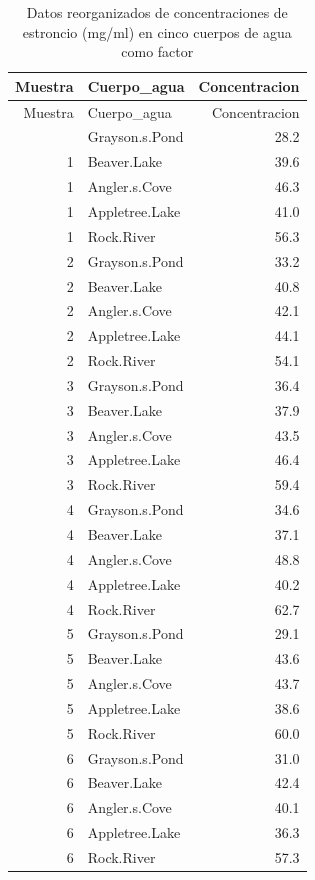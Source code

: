 \documentclass[
]{article}
\begin{document}
\begin{longtable}[]{@{}rlr@{}}
\caption{Datos reorganizados de concentraciones de estroncio (mg/ml) en
cinco cuerpos de agua como factor}\tabularnewline
\toprule\noalign{}
Muestra & Cuerpo\_agua & Concentracion \\
\midrule\noalign{}
\endfirsthead
\toprule\noalign{}
Muestra & Cuerpo\_agua & Concentracion \\
\midrule\noalign{}
\endhead
\bottomrule\noalign{}
\endlastfoot
1 & Grayson.s.Pond & 28.2 \\
1 & Beaver.Lake & 39.6 \\
1 & Angler.s.Cove & 46.3 \\
1 & Appletree.Lake & 41.0 \\
1 & Rock.River & 56.3 \\
2 & Grayson.s.Pond & 33.2 \\
2 & Beaver.Lake & 40.8 \\
2 & Angler.s.Cove & 42.1 \\
2 & Appletree.Lake & 44.1 \\
2 & Rock.River & 54.1 \\
3 & Grayson.s.Pond & 36.4 \\
3 & Beaver.Lake & 37.9 \\
3 & Angler.s.Cove & 43.5 \\
3 & Appletree.Lake & 46.4 \\
3 & Rock.River & 59.4 \\
4 & Grayson.s.Pond & 34.6 \\
4 & Beaver.Lake & 37.1 \\
4 & Angler.s.Cove & 48.8 \\
4 & Appletree.Lake & 40.2 \\
4 & Rock.River & 62.7 \\
5 & Grayson.s.Pond & 29.1 \\
5 & Beaver.Lake & 43.6 \\
5 & Angler.s.Cove & 43.7 \\
5 & Appletree.Lake & 38.6 \\
5 & Rock.River & 60.0 \\
6 & Grayson.s.Pond & 31.0 \\
6 & Beaver.Lake & 42.4 \\
6 & Angler.s.Cove & 40.1 \\
6 & Appletree.Lake & 36.3 \\
6 & Rock.River & 57.3 \\
\end{longtable}
\end{document}
